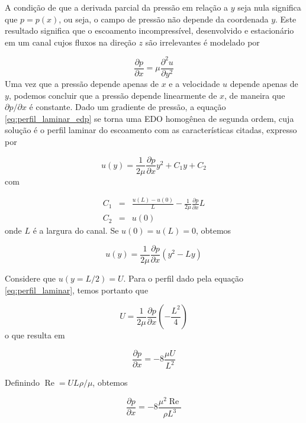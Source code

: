 \documentclass[a4paper,portuguese,10pt]{article}
\renewcommand{\D}{\partial}
\renewcommand{\Re}{\operatorname{Re}}
\begin{document}
A condição de que a derivada parcial da pressão em relação a $y$ seja nula significa que $p = p(x)$, ou seja, o campo de pressão não depende da coordenada $y$. Este resultado significa que o escoamento incompressível, desenvolvido e estacionário em um canal cujos fluxos na direção $z$ são irrelevantes é modelado por

\begin{equation}
  \frac{\D p}{\D x}=\mu\frac{\D^2u}{\D y^2}
  \label{eq:perfil_laminar_edp}
\end{equation}
Uma vez que a pressão depende apenas de $x$ e a velocidade $u$ depende apenas de $y$, podemos concluir que a pressão depende linearmente de $x$, de maneira que $\D p/\D x$ é constante. Dado um gradiente de pressão, a equação \ref{eq:perfil_laminar_edp} se torna uma EDO homogênea de segunda ordem, cuja solução é o perfil laminar do escoamento com as características citadas, expresso por

\begin{equation}
  u(y) = \frac{1}{2\mu}\frac{\D p}{\D x}y^2+C_1y+C_2
\end{equation}
com

\begin{subequations}
  \begin{eqnarray}
    C_1 &=& \frac{u(L)-u(0)}{L}-\frac{1}{2\mu}\frac{\D p}{\D x}L\\
    C_2 &=& u(0)
  \end{eqnarray}
\end{subequations}
onde $L$ é a largura do canal. Se $u(0)=u(L)=0$, obtemos

\begin{equation}
  u(y) = \frac{1}{2\mu}\frac{\D p}{\D x}\left(y^2-Ly\right)
  \label{eq:perfil_laminar}
\end{equation}

Considere que $u(y=L/2)=U$. Para o perfil dado pela equação \ref{eq:perfil_laminar}, temos portanto que

\begin{equation}
  U = \frac{1}{2\mu}\frac{\D p}{\D x}\left(-\frac{L^2}{4}\right)
\end{equation}
o que resulta em

\begin{equation}
  \frac{\D p}{\D x}=-8\frac{\mu U}{L^2}
\end{equation}

Definindo $\Re=UL\rho/\mu$, obtemos

\begin{equation}
  \frac{\D p}{\D x}=-8\frac{\mu^2\Re}{\rho L^3}
  \label{eq:gradp}
\end{equation}
\end{document}
